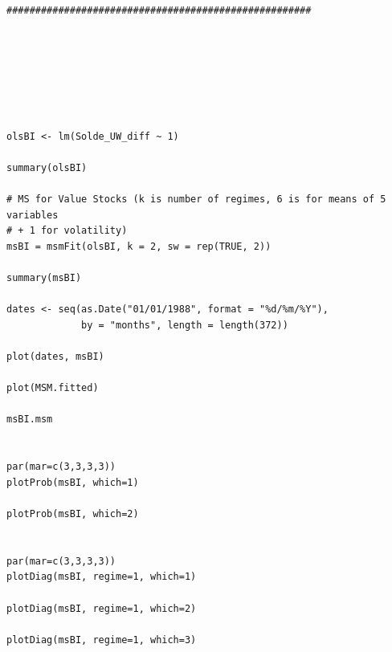 \documentclass[12pt,a4paper,oneside]{book}
\begin{document}
\begin{lstlisting}
#####################################################







olsBI <- lm(Solde_UW_diff ~ 1)

summary(olsBI)

# MS for Value Stocks (k is number of regimes, 6 is for means of 5 variables
# + 1 for volatility)
msBI = msmFit(olsBI, k = 2, sw = rep(TRUE, 2))

summary(msBI)

dates <- seq(as.Date("01/01/1988", format = "%d/%m/%Y"),
             by = "months", length = length(372))

plot(dates, msBI)

plot(MSM.fitted)

msBI.msm


par(mar=c(3,3,3,3))
plotProb(msBI, which=1)

plotProb(msBI, which=2)


par(mar=c(3,3,3,3))
plotDiag(msBI, regime=1, which=1)

plotDiag(msBI, regime=1, which=2)

plotDiag(msBI, regime=1, which=3)

\end{lstlisting}


\newpage
\end{document}
